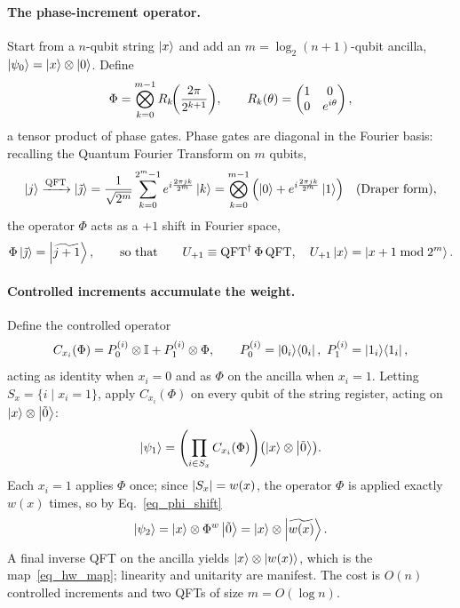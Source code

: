 \documentclass[11pt]{article}
\newcommand{\Id}{\mathbb{I}}
\begin{document}
\paragraph{The phase-increment operator.}
Start from a $n$-qubit string $\ket{x}$ and add an $m=\log_2(n+1)$-qubit ancilla, $\ket{\psi_0}=\ket{x}\otimes\ket{0}$. Define
\begin{equation}
\Phi=\bigotimes_{k=0}^{m-1}R_k\!\qty(\frac{2\pi}{2^{k+1}}),
\qquad
R_k(\theta)=\begin{pmatrix}1&0\\0&e^{i\theta}\end{pmatrix},
\end{equation}
a tensor product of phase gates. Phase gates are diagonal in the Fourier basis: recalling the Quantum Fourier Transform on $m$ qubits,
\begin{equation}
\ket{j}\xrightarrow{\mathrm{QFT}}\ket{\tilde\jmath}=\frac{1}{\sqrt{2^m}}\sum_{k=0}^{2^m-1}e^{i\frac{2\pi jk}{2^m}}\ket{k}
=\bigotimes_{k=0}^{m-1}\qty(\ket{0}+e^{i\frac{2\pi j k}{2^m}}\ket{1})\quad(\text{Draper form}),
\end{equation}
the operator $\Phi$ acts as a $+1$ shift in Fourier space,
\begin{equation}\label{eq_phi_shift}
\Phi\ket{\tilde\jmath}=\ket{\widetilde{j+1}},
\qquad\text{so that}\qquad
U_{+1}\equiv\mathrm{QFT}^\dagger\,\Phi\,\mathrm{QFT},\quad U_{+1}\ket{x}=\ket{x+1\bmod 2^m}.
\end{equation}

\paragraph{Controlled increments accumulate the weight.}
Define the controlled operator
\begin{equation}
C_{x_i}(\Phi)=P_0^{(i)}\otimes\Id+P_1^{(i)}\otimes\Phi,
\qquad P_0^{(i)}=\ket{0_i}\!\bra{0_i},\ P_1^{(i)}=\ket{1_i}\!\bra{1_i},
\end{equation}
acting as identity when $x_i=0$ and as $\Phi$ on the ancilla when $x_i=1$. Letting $S_x=\{i\mid x_i=1\}$, apply $C_{x_i}(\Phi)$ on every qubit of the string register, acting on $\ket{x}\otimes\ket{\tilde 0}$:
\begin{equation}
\ket{\psi_1}=\qty(\prod_{i\in S_x}C_{x_i}(\Phi))\qty(\ket{x}\otimes\ket{\tilde 0}).
\end{equation}
Each $x_i=1$ applies $\Phi$ once; since $\abs{S_x}=w(x)$, the operator $\Phi$ is applied exactly $w(x)$ times, so by Eq.~\eqref{eq_phi_shift}
\begin{equation}
\ket{\psi_2}=\ket{x}\otimes\Phi^{w}\ket{\tilde 0}=\ket{x}\otimes\ket{\widetilde{w(x)}}.
\end{equation}
A final inverse QFT on the ancilla yields $\ket{x}\otimes\ket{w(x)}$, which is the map~\eqref{eq_hw_map}; linearity and unitarity are manifest. The cost is $O(n)$ controlled increments and two QFTs of size $m=O(\log n)$.
\end{document}
